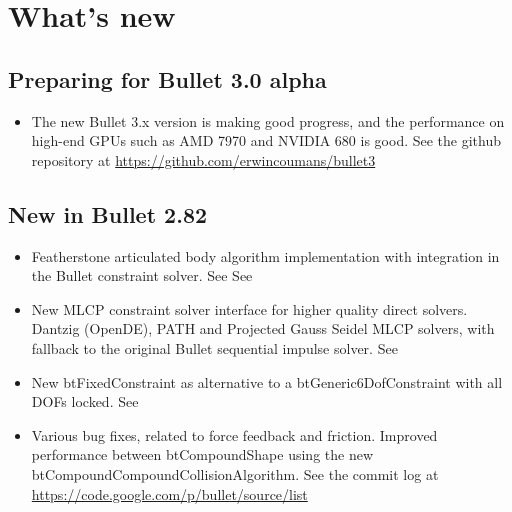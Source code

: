 \section{What's new}

\subsection{Preparing for Bullet 3.0 alpha}
\begin{itemize}
	\item The new Bullet 3.x version is making good progress, and the performance on high-end GPUs such as AMD 7970 and NVIDIA 680 is good. See the github repository at \url{https://github.com/erwincoumans/bullet3}
\end{itemize}	
\subsection{New in Bullet 2.82}
\begin{itemize}
	\item Featherstone articulated body algorithm implementation with integration in the Bullet constraint solver. See See 
	\item New MLCP constraint solver interface for higher quality direct solvers. Dantzig (OpenDE), PATH and Projected Gauss Seidel MLCP solvers, with fallback to the original Bullet sequential impulse solver. See 
	\item New btFixedConstraint as alternative to a btGeneric6DofConstraint with all DOFs locked. See 
	\item Various bug fixes, related to force feedback and friction. Improved performance between btCompoundShape using the new btCompoundCompoundCollisionAlgorithm. See the commit log at \url{https://code.google.com/p/bullet/source/list}
\end{itemize}
